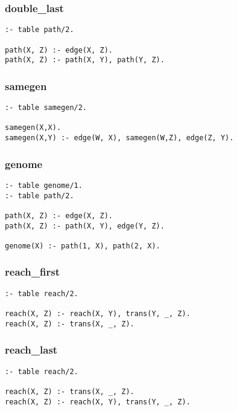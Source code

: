 \subsubsection*{double\_last}

\begin{Verbatim}
:- table path/2.

path(X, Z) :- edge(X, Z).
path(X, Z) :- path(X, Y), path(Y, Z).
\end{Verbatim}

\subsubsection*{samegen}

\begin{Verbatim}
:- table samegen/2.

samegen(X,X).
samegen(X,Y) :- edge(W, X), samegen(W,Z), edge(Z, Y).
\end{Verbatim}

\subsubsection*{genome}

\begin{Verbatim}
:- table genome/1.
:- table path/2.

path(X, Z) :- edge(X, Z).
path(X, Z) :- path(X, Y), edge(Y, Z).

genome(X) :- path(1, X), path(2, X).
\end{Verbatim}

\subsubsection*{reach\_first}

\begin{Verbatim}   
:- table reach/2.

reach(X, Z) :- reach(X, Y), trans(Y, _, Z).
reach(X, Z) :- trans(X, _, Z).
\end{Verbatim}

\subsubsection*{reach\_last}

\begin{Verbatim}
:- table reach/2.

reach(X, Z) :- trans(X, _, Z).
reach(X, Z) :- reach(X, Y), trans(Y, _, Z).
\end{Verbatim}

